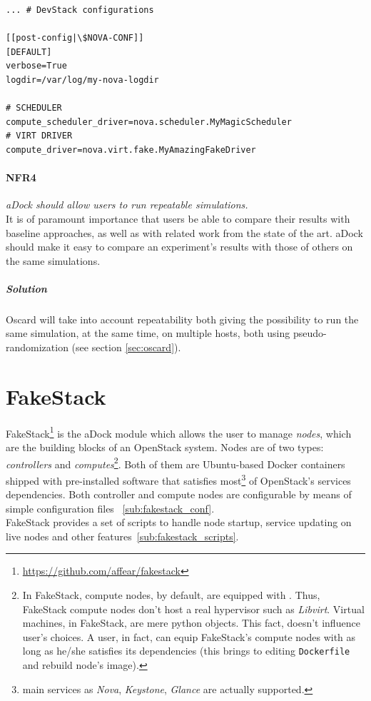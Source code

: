 \begin{lstlisting}[title=Adding per-service configuration to DevStack's local.conf file]
... # DevStack configurations

[[post-config|\$NOVA-CONF]]
[DEFAULT]
verbose=True
logdir=/var/log/my-nova-logdir

# SCHEDULER
compute_scheduler_driver=nova.scheduler.MyMagicScheduler
# VIRT DRIVER
compute_driver=nova.virt.fake.MyAmazingFakeDriver
\end{lstlisting}


\paragraph{NFR4}\label{p:nfr4} \emph{aDock should allow users to run repeatable simulations.} \hfill \\
It is of paramount importance that users be able to compare their results with baseline approaches, as well as with related work from the state of the art. aDock should make it easy to compare an experiment's results with those of others on the same simulations.

\subparagraph{Solution} Oscard will take into account repeatability both giving the possibility to run the same simulation, at the same time, on multiple hosts, both using pseudo-randomization (see section \ref{sec:oscard}).


\section{FakeStack}
\label{sec:fakestack}
FakeStack\footnote{\url{https://github.com/affear/fakestack}} is the aDock module which allows the user to manage \textit{nodes}, which are the building blocks of an OpenStack system. Nodes are of two types: \textit{controllers} and \textit{computes}\footnote{In FakeStack, compute nodes, by default, are equipped with . Thus, FakeStack compute nodes don't host a real hypervisor such as \textit{Libvirt}. Virtual machines, in FakeStack, are mere python objects. This fact, doesn't influence user's choices. A user, in fact, can equip FakeStack's compute nodes with  as long as he/she satisfies its dependencies (this brings to editing \texttt{Dockerfile} and rebuild node's image).}. Both of them are Ubuntu-based Docker containers shipped with pre-installed software that satisfies most\footnote{main services as \textit{Nova}, \textit{Keystone}, \textit{Glance} are actually supported.} of OpenStack's services dependencies. Both controller and compute nodes are configurable by means of simple configuration files ~\ref{sub:fakestack_conf}.\\
FakeStack provides a set of scripts to handle node startup, service updating on live nodes and other features~\ref{sub:fakestack_scripts}.

